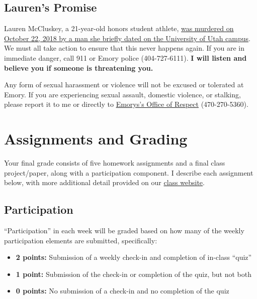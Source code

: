 \documentclass[11pt,]{article}
\providecommand{\tightlist}{%
  \setlength{\itemsep}{0pt}\setlength{\parskip}{0pt}}
\begin{document}
\hypertarget{laurens-promise}{%
\subsection{Lauren's Promise}\label{laurens-promise}}

Lauren McCluskey, a 21-year-old honors student athlete,
\href{https://www.sltrib.com/opinion/commentary/2019/02/10/commentary-failing-lauren/}{was
murdered on October 22, 2018 by a man she briefly dated on the
University of Utah campus}. We must all take action to ensure that this
never happens again. If you are in immediate danger, call 911 or Emory
police (404-727-6111). \textbf{I will listen and believe you if someone
is threatening you.}

Any form of sexual harassment or violence will not be excused or
tolerated at Emory. If you are experiencing sexual assault, domestic
violence, or stalking, please report it to me or directly to
\href{http://respect.emory.edu/index.html}{Emorys's Office of Respect}
(470-270-5360).

\hypertarget{assignments-and-grading}{%
\section{Assignments and Grading}\label{assignments-and-grading}}

Your final grade consists of five homework assignments and a final class
project/paper, along with a participation component. I describe each
assignment below, with more additional detail provided on our
\href{https://econ470s22.classes.ianmccarthyecon.com/}{class website}.

\hypertarget{participation}{%
\subsection{Participation}\label{participation}}

``Participation'' in each week will be graded based on how many of the
weekly participation elements are submitted, specifically:

\begin{itemize}
\tightlist
\item
  \textbf{2 points:} Submission of a weekly check-in and completion of
  in-class ``quiz''
\item
  \textbf{1 point:} Submission of the check-in or completion of the
  quiz, but not both
\item
  \textbf{0 points:} No submission of a check-in and no completion of
  the quiz
\end{itemize}
\end{document}
